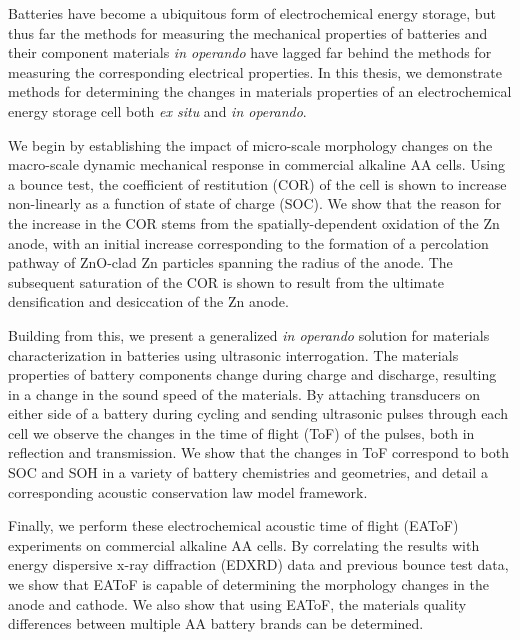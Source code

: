 Batteries have become a ubiquitous form of electrochemical energy storage, but thus far the methods for measuring the mechanical properties of batteries and their component materials \textit{in operando} have lagged far behind the methods for measuring the corresponding electrical properties. In this thesis, we demonstrate methods for determining the changes in materials properties of an electrochemical energy storage cell both \textit{ex situ} and \textit{in operando}.

We begin by establishing the impact of micro-scale morphology changes on the macro-scale dynamic mechanical response in commercial alkaline AA cells. Using a bounce test, the coefficient of restitution (COR) of the cell is shown to increase non-linearly as a function of state of charge (SOC). We show that the reason for the increase in the COR stems from the spatially-dependent oxidation of the Zn anode, with an initial increase corresponding to the formation of a percolation pathway of ZnO-clad Zn particles spanning the radius of the anode. The subsequent saturation of the COR is shown to result from the ultimate densification and desiccation of the Zn anode.

Building from this, we present a generalized \textit{in operando} solution for materials characterization in batteries using ultrasonic interrogation. The materials properties of battery components change during charge and discharge, resulting in a change in the sound speed of the materials. By attaching transducers on either side of a battery during cycling and sending ultrasonic pulses through each cell we observe the changes in the time of flight (ToF) of the pulses, both in reflection and transmission. We show that the changes in ToF correspond to both SOC and SOH in a variety of battery chemistries and geometries, and detail a corresponding acoustic conservation law model framework. 

Finally, we perform these electrochemical acoustic time of flight (EAToF) experiments on commercial alkaline AA cells. By correlating the results with energy dispersive x-ray diffraction (EDXRD) data and previous bounce test data, we show that EAToF is capable of determining the morphology changes in the anode and cathode. We also show that using EAToF, the materials quality differences between multiple AA battery brands can be determined.